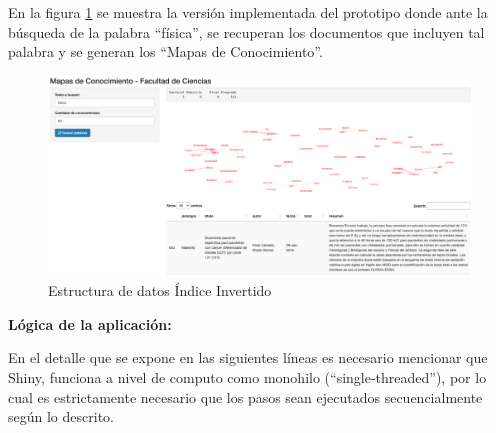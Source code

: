 \documentclass[
  12pt,
  openany]{book}
\begin{document}
En la figura \ref{fig:prototipoapp} se muestra la versión implementada del prototipo donde ante la búsqueda de la palabra ``física'', se recuperan los documentos que incluyen tal palabra y se generan los ``Mapas de Conocimiento''.

\begin{figure}

{\centering \includegraphics[width=0.8\linewidth]{images/05-desarrollo/2_ciclo/UI/prototipo_app} 

}

\caption{Estructura de datos Índice Invertido}\label{fig:prototipoapp}
\end{figure}

\textbf{Lógica de la aplicación:}

En el detalle que se expone en las siguientes líneas es necesario mencionar que Shiny, funciona a nivel de computo como monohilo (``single-threaded''), por lo cual es estrictamente necesario que los pasos sean ejecutados secuencialmente según lo descrito.
\end{document}

